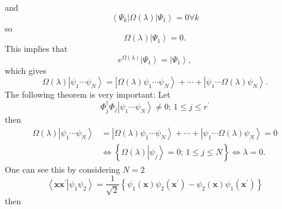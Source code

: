 \documentclass[aps,preprint]{revtex4}%
\begin{document}
and
\begin{equation}
\left\langle \Psi_{k}\right\vert \Omega\left(  \lambda\right)  \left\vert
\Psi_{1}\right\rangle =0\forall k
\end{equation}
so
\begin{equation}
\Omega\left(  \lambda\right)  \left\vert \Psi_{1}\right\rangle =0.
\end{equation}
This implies that
\begin{equation}
e^{\Omega\left(  \lambda\right)  }\left\vert \Psi_{1}\right\rangle =\left\vert
\Psi_{1}\right\rangle ,
\end{equation}
which gives
\begin{equation}
\Omega\left(  \lambda\right)  \left\vert \psi_{1}\cdots\psi_{N}\right\rangle
=\left\vert \Omega\left(  \lambda\right)  \psi_{1}\cdots\psi_{N}\right\rangle
+\cdots+\left\vert \psi_{1}\cdots\Omega\left(  \lambda\right)  \psi
_{N}\right\rangle .
\end{equation}
The following theorem is very important: Let
\begin{equation}
\Phi_{j}^{\dagger}\Phi_{j}\left\vert \psi_{1}\cdots\psi_{N}\right\rangle
\neq0;\,1\leq j\leq r^{\prime}%
\end{equation}
then
\begin{align}
\Omega\left(  \lambda\right)  \left\vert \psi_{1}\cdots\psi_{N}\right\rangle
&  =\left\vert \Omega\left(  \lambda\right)  \psi_{1}\cdots\psi_{N}%
\right\rangle +\cdots+\left\vert \psi_{1}\cdots\Omega\left(  \lambda\right)
\psi_{N}\right\rangle =0\nonumber\\
&  \Leftrightarrow\left\{  \Omega\left(  \lambda\right)  \left\vert \psi
_{j}\right\rangle =0;\,1\leq j\leq N\right\}  \Leftrightarrow\lambda=0.
\end{align}
One can see this by considering $N=2$
\begin{equation}
\left\langle \left.  \mathbf{xx}^{\prime}\right\vert \psi_{1}\psi
_{2}\right\rangle =\frac{1}{\sqrt{2}}\left\{  \psi_{1}\left(  \mathbf{x}%
\right)  \psi_{2}\left(  \mathbf{x}^{\prime}\right)  -\psi_{2}\left(
\mathbf{x}\right)  \psi_{1}\left(  \mathbf{x}^{\prime}\right)  \right\}
\end{equation}
then%
\end{document}
